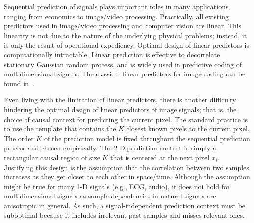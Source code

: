 \documentclass{article}
\newcommand{\etal}{\textit{et al}.}
\begin{document}
Sequential prediction of signals plays important roles in many applications, ranging from economics to image/video processing.  Practically, all existing predictors used in image/video processing and computer vision are linear.  This linearity is not due to the nature of the underlying physical problems; instead, it is only the result of operational expediency.  Optimal design of linear predictors is computationally intractable.
Linear prediction is effective to decorrelate stationary Gaussian random process, and is widely used in predictive coding of multidimensional signals. The classical linear predictors for image coding can be found in~\cite{wu1998,li2001,takeda2006,kervrann2008,memon2000,akimov2007}.

Even living with the limitation of linear predictors, there is another difficulty hindering the optimal design of linear predictors of image signals; that is, the choice of causal context for predicting the current pixel.  The standard practice is to use the template that contains the $K$ closest known pixels to the current pixel.
The order $K$ of the prediction model is fixed throughout the sequential prediction process and chosen empirically. The 2-D prediction context is simply a rectangular causal region of size $K$ that is centered at the next pixel $x_i$. Justifying this design is the assumption that the correlation between two samples increases as they get closer to each other in space/time. Although the assumption might be true for many 1-D signals (e.g., ECG, audio), it does not hold for multidimensional signals as sample dependencies in natural signals are anisotropic in general.  As such, a signal-independent prediction context must be suboptimal because it includes irrelevant past samples and misses relevant ones.

\end{document}
